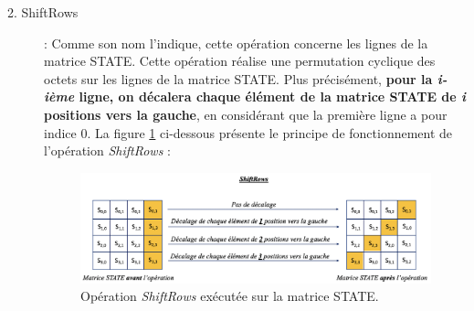 \documentclass[oneside]{book}
\begin{document}
\begin{description}
\item[2. ShiftRows] : Comme son nom l'indique, cette opération concerne les lignes de la matrice STATE. Cette opération réalise une permutation cyclique des octets sur les lignes de la matrice STATE. Plus précisément, \textbf{pour la \textit{i-ième} ligne, on décalera chaque élément de la matrice STATE de \textit{i} positions vers la gauche}, en considérant que la première ligne a pour indice 0.
La figure \ref{fig:ligne} ci-dessous présente le principe de fonctionnement de l'opération \textit{ShiftRows} :
\begin{figure}[htbp]
    \centering
    \includegraphics[scale=0.55]{image/ligne}
    \caption{Opération \textit{ShiftRows} exécutée sur la matrice STATE.}
    \label{fig:ligne}
\end{figure}


\end{description}
\end{document}
